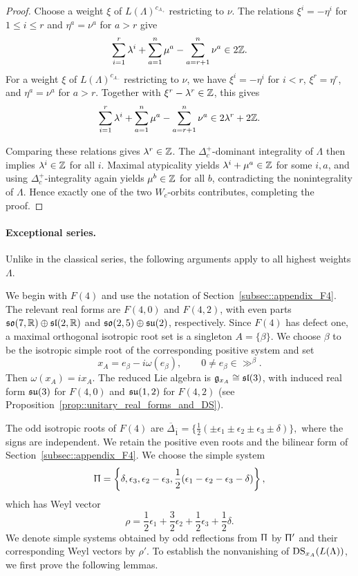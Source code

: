 \begin{proof}
Choose a weight $\xi$ of $L(\Lambda)^{c_{A_+}}$ restricting to $\nu$. The relations $\xi^i=-\eta^i$ for $1\leq i\leq r$ and $\eta^a=\nu^a$ for $a>r$ give
\[
\sum_{i=1}^r\lambda^i+\sum_{a=1}^n\mu^a-\sum_{a=r+1}^n\nu^a\in2\ZZ.
\]
For a weight $\xi$ of $L(\Lambda)^{c_{A_-}}$ restricting to $\nu$, we have $\xi^i=-\eta^i$ for $i<r$, $\xi^r=\eta^r$, and $\eta^a=\nu^a$ for $a>r$. Together with $\xi^r-\lambda^r\in\ZZ$, this gives
\[
\sum_{i=1}^r\lambda^i+\sum_{a=1}^n\mu^a-\sum_{a=r+1}^n\nu^a
\in2\lambda^r+2\ZZ.
\]

Comparing these relations gives $\lambda^r\in\ZZ$. The $\Delta_c^+$-dominant integrality of $\Lambda$ then implies $\lambda^i\in\ZZ$ for all $i$. Maximal atypicality yields $\lambda^i+\mu^a\in\ZZ$ for some $i,a$, and using $\Delta_c^+$-integrality again yields $\mu^b\in\ZZ$ for all $b$, contradicting the nonintegrality of $\Lambda$. Hence exactly one of the two $W_c$-orbits contributes, completing the proof.
\end{proof}

\paragraph{\textbf{Exceptional series.}}

Unlike in the classical series, the following arguments apply to all highest weights $\Lambda$.

We begin with $F(4)$ and use the notation of Section~\ref{subsec::appendix_F4}. The relevant real forms are $F(4,0)$ and $F(4,2)$, with even parts $\so(7,\RR)\oplus\sl(2,\RR)$ and $\so(2,5)\oplus\su(2)$, respectively. Since $F(4)$ has defect one, a maximal orthogonal isotropic root set is a singleton $A=\{\beta\}$. We choose $\beta$ to be the isotropic simple root of the corresponding positive system and set
\begin{equation}
x_A=e_\beta-i\omega(e_\beta),
\qquad 0\neq e_\beta\in\gg^\beta.
\end{equation}
Then $\omega(x_A)=ix_A$. The reduced Lie algebra is $\gg_{x_A}\cong\sl(3)$, with induced real form $\su(3)$ for $F(4,0)$ and $\su(1,2)$ for $F(4,2)$ (see Proposition~\ref{prop::unitary_real_forms_and_DS}).


The odd isotropic roots of $F(4)$ are
$
\overline{\Delta}_{\bar1}
=
\{
\frac12(\pm\epsilon_1\pm\epsilon_2\pm\epsilon_3\pm\delta)\},
$
where the signs are independent. We retain the positive even roots and the bilinear form of Section~\ref{subsec::appendix_F4}. We choose the simple system
\begin{equation}
\Uppi
=
\left\{
\delta,\epsilon_3,\epsilon_2-\epsilon_3,
\frac12(\epsilon_1-\epsilon_2-\epsilon_3-\delta)
\right\},
\end{equation}
which has Weyl vector
\begin{equation}\label{eq::rho_F4}
\rho
=
\frac12\epsilon_1+\frac32\epsilon_2
+\frac12\epsilon_3+\frac12\delta.
\end{equation}
We denote simple systems obtained by odd reflections from $\Uppi$ by $\Uppi'$ and their corresponding Weyl vectors by $\rho'$. To establish the nonvanishing of $\DS_{x_A}(L(\Lambda))$, we first prove the following lemmas.

